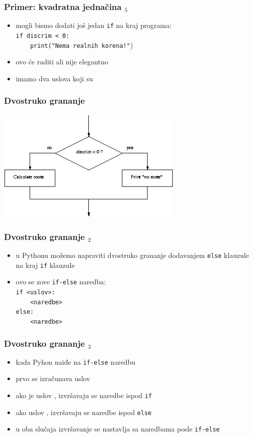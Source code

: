\documentclass[utf8,compress,aspectratio=169]{beamer}
\begin{document}
\begin{frame}[fragile]
  \frametitle{Primer: kvadratna jednačina $_5$}
  \begin{itemize}
    \item mogli bismo dodati još jedan \texttt{if} na kraj programa: \\
        \texttt{if discrim < 0:} \\
        \texttt{\ \ \ \ print("Nema realnih korena!"})
    \item ovo će raditi ali nije elegantno
    \item imamo dva uslova koji su 
  \end{itemize}
\end{frame}

\begin{frame}[fragile]
  \frametitle{Dvostruko grananje}
  \begin{center}
    \includegraphics[width=9cm]{pic15}
  \end{center}
\end{frame}

\begin{frame}[fragile]
  \frametitle{Dvostruko grananje $_2$}
  \begin{itemize}
    \item u Pythonu možemo napraviti dvostruko grananje dodavanjem \texttt{else} klauzule na kraj \texttt{if} klauzule
    \item ovo se zove \texttt{if-else} naredba: \\
        \texttt{if <uslov>:} \\
        \texttt{\ \ \ \ <naredbe>} \\
        \texttt{else:} \\
        \texttt{\ \ \ \ <naredbe>}
  \end{itemize}
\end{frame}

\begin{frame}[fragile]
  \frametitle{Dvostruko grananje $_3$}
  \begin{itemize}
    \item kada Pyhon naiđe na \texttt{if-else} naredbu
    \item prvo se izračunava uslov
    \item ako je uslov , izvršavaju se naredbe ispod \texttt{if}
    \item ako uslov , izvršavaju se naredbe ispod \texttt{else}
    \item u oba slučaja izvršavanje se nastavlja sa naredbama posle \texttt{if-else}
  \end{itemize}
\end{frame}
\end{document}
